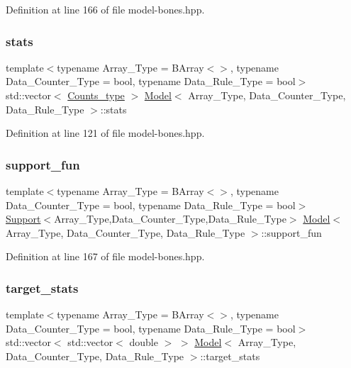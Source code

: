 Definition at line 166 of file model-\/bones.\+hpp.

\mbox{\label{class_model_abd7e36250a681bd2ade69d087e8200e1}} 
\subsubsection{\texorpdfstring{stats}{stats}}
{\footnotesize\ttfamily template$<$typename Array\+\_\+\+Type = B\+Array$<$$>$, typename Data\+\_\+\+Counter\+\_\+\+Type = bool, typename Data\+\_\+\+Rule\+\_\+\+Type = bool$>$ \\
std\+::vector$<$ \hyperlink{typedefs_8hpp_aee40fa17c1fddb63dd1f2b1470ade95b}{Counts\+\_\+type} $>$ \hyperlink{class_model}{Model}$<$ Array\+\_\+\+Type, Data\+\_\+\+Counter\+\_\+\+Type, Data\+\_\+\+Rule\+\_\+\+Type $>$\+::stats}



Definition at line 121 of file model-\/bones.\+hpp.

\mbox{\label{class_model_aa9806f4bf7d9c935f37a31e67bbfbee4}} 
\subsubsection{\texorpdfstring{support\+\_\+fun}{support\_fun}}
{\footnotesize\ttfamily template$<$typename Array\+\_\+\+Type = B\+Array$<$$>$, typename Data\+\_\+\+Counter\+\_\+\+Type = bool, typename Data\+\_\+\+Rule\+\_\+\+Type = bool$>$ \\
\hyperlink{class_support}{Support}$<$Array\+\_\+\+Type,Data\+\_\+\+Counter\+\_\+\+Type,Data\+\_\+\+Rule\+\_\+\+Type$>$ \hyperlink{class_model}{Model}$<$ Array\+\_\+\+Type, Data\+\_\+\+Counter\+\_\+\+Type, Data\+\_\+\+Rule\+\_\+\+Type $>$\+::support\+\_\+fun}



Definition at line 167 of file model-\/bones.\+hpp.

\mbox{\label{class_model_a24ad6e57bff2297dcc7461609714f41b}} 
\subsubsection{\texorpdfstring{target\+\_\+stats}{target\_stats}}
{\footnotesize\ttfamily template$<$typename Array\+\_\+\+Type = B\+Array$<$$>$, typename Data\+\_\+\+Counter\+\_\+\+Type = bool, typename Data\+\_\+\+Rule\+\_\+\+Type = bool$>$ \\
std\+::vector$<$ std\+::vector$<$ double $>$ $>$ \hyperlink{class_model}{Model}$<$ Array\+\_\+\+Type, Data\+\_\+\+Counter\+\_\+\+Type, Data\+\_\+\+Rule\+\_\+\+Type $>$\+::target\+\_\+stats}




